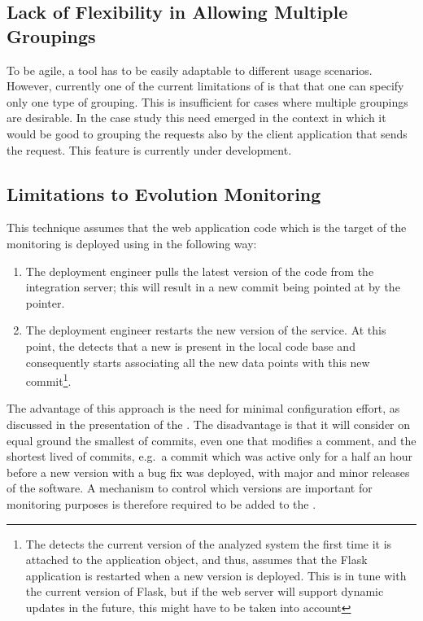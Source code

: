   \subsection*{Lack of Flexibility in Allowing Multiple Groupings}

    To be agile, a tool has to be easily adaptable to different usage scenarios. However, currently one of the current limitations of \tool is that that one can specify only one type of grouping. This is insufficient for cases where multiple groupings are desirable. In the \zee case study this need emerged in the context in which it would be good to grouping the requests also by the client application that sends the request. This feature is currently under development.

  \subsection*{Limitations to Evolution Monitoring}

    This technique assumes that the web application code which is the target of the monitoring is deployed using \git in the following way: 

    \begin{enumerate}
      \item The deployment engineer pulls the latest version of the code from the integration server; this will result in a new commit being pointed at by the  pointer. %
      \item The deployment engineer restarts the new version of the service. At this point, the \tool detects that a new  is present in the local code base and consequently starts associating all the new data points with this new commit\footnote{The \tool detects the current version of the analyzed system the first time it is attached to the application object, and thus, assumes that the Flask application is restarted when a new version is deployed. This is in tune with the current version of Flask, but if the web server will support dynamic updates in the future, this might have to be taken into account}.
    \end{enumerate}

      The advantage of this approach is the need for minimal configuration effort, as discussed in the presentation of the \tool. The disadvantage is that it will consider on equal ground the smallest of commits, even one that modifies a comment, and the shortest lived of commits, e.g.~a commit which was active only for a half an hour before a new version with a bug fix was deployed, with major and minor releases of the software. %
    A mechanism to control which versions are important for monitoring purposes is therefore required to be added to the \tool.


